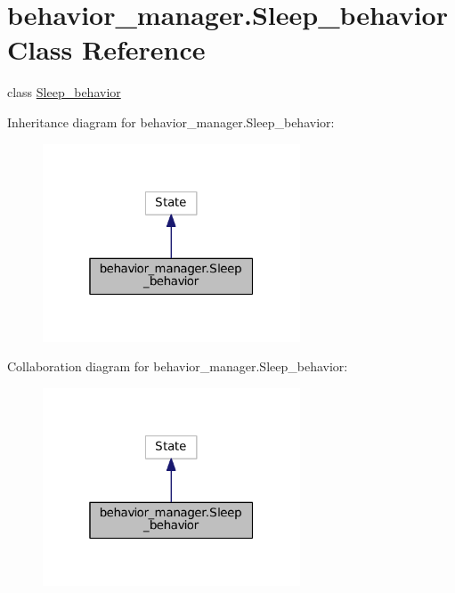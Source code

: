 \hypertarget{classbehavior__manager_1_1Sleep__behavior}{}\section{behavior\+\_\+manager.\+Sleep\+\_\+behavior Class Reference}
\label{classbehavior__manager_1_1Sleep__behavior}


class \hyperlink{classbehavior__manager_1_1Sleep__behavior}{Sleep\+\_\+behavior}  




Inheritance diagram for behavior\+\_\+manager.\+Sleep\+\_\+behavior\+:\nopagebreak
\begin{figure}[H]
\begin{center}
\leavevmode
\includegraphics[width=217pt]{classbehavior__manager_1_1Sleep__behavior__inherit__graph}
\end{center}
\end{figure}


Collaboration diagram for behavior\+\_\+manager.\+Sleep\+\_\+behavior\+:\nopagebreak
\begin{figure}[H]
\begin{center}
\leavevmode
\includegraphics[width=217pt]{classbehavior__manager_1_1Sleep__behavior__coll__graph}
\end{center}
\end{figure}
